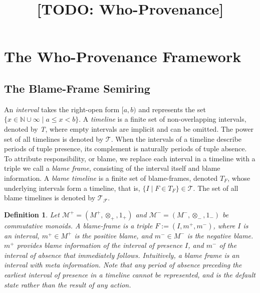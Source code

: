 \documentclass[
]{ceurart}
\theoremstyle{plain}
\newtheorem{definition}{Definition}
\begin{document}
\title{[TODO: Who-Provenance]}

\section{The Who-Provenance Framework}
\subsection{The Blame-Frame Semiring}
An \emph{interval} takes the right-open form $[a,b)$ and represents the set $\{x\in \mathbb{N} \cup \infty \mid a \le x < b\}$. A \emph{timeline} is a finite set of non-overlapping intervals, denoted by \emph{T}, where empty intervals are implicit and can be omitted. The power set of all timelines is denoted by $\mathcal{T}$. When the intervals of a timeline describe periods of tuple presence, its complement is naturally periods of tuple absence. To attribute responsibility, or blame, we replace each interval in a timeline with a triple we call a \emph{blame frame}, consisting of the interval itself and blame information. A \emph{blame timeline} is a finite set of blame-frames, denoted $T_F$, whose underlying intervals form a timeline, that is, $\{I \mid F \in T_F\} \in \mathcal{T}$. The set of all blame timelines is denoted by $\mathcal{T}_\mathcal{F}$. 

\begin{definition}
    Let $\mathcal{M}^+ = (M^+, \otimes_+, 1_+)$ and $\mathcal{M}^- = (M^-, \otimes_-, 1_-)$ be commutative monoids. A \emph{blame-frame} is a triple $F := (I,m^+,m^-)$, where $I$ is an interval, $m^+ \in M^+$ is the \emph{positive blame}, and $m^- \in M^-$ is the \emph{negative blame}. $m^+$ provides blame information of the interval of presence $I$, and $m^-$ of the interval of absence that immediately follows. Intuitively, a blame frame is an interval with meta information. Note that any period of absence preceding the earliest interval of presence in a timeline cannot be represented, and is the default state rather than the result of any action.
\end{definition}
\end{document}
